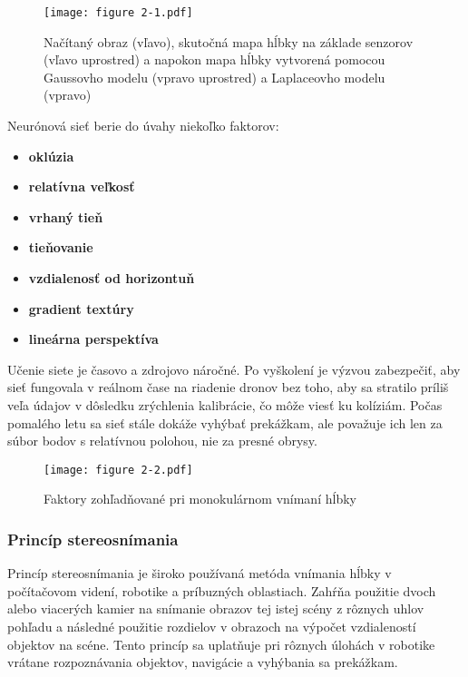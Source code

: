 \begin{figure}[ht!]
    \centering
    \texttt{[image: figure 2-1.pdf]}
    \caption{Načítaný obraz (vľavo), skutočná mapa hĺbky na základe senzorov (vľavo uprostred) a napokon mapa hĺbky vytvorená pomocou Gaussovho modelu (vpravo uprostred) a Laplaceovho modelu (vpravo)}
    \label{o:2-1}
\end{figure}

Neurónová sieť berie do úvahy niekoľko faktorov:
\begin{itemize}
    \item \textbf{oklúzia}
    \item \textbf{relatívna veľkosť}
    \item \textbf{vrhaný tieň}
    \item \textbf{tieňovanie}
    \item \textbf{vzdialenosť od horizontuň}
    \item \textbf{gradient textúry}
    \item \textbf{lineárna perspektíva}
\end{itemize}
Učenie siete je časovo a zdrojovo náročné. Po vyškolení je výzvou zabezpečiť, aby sieť fungovala v reálnom čase na riadenie dronov bez toho, aby sa stratilo príliš veľa údajov v dôsledku zrýchlenia kalibrácie, čo môže viesť ku kolíziám. Počas pomalého letu sa sieť stále dokáže vyhýbať prekážkam, ale považuje ich len za súbor bodov s relatívnou polohou, nie za presné obrysy.

\begin{figure}[ht!]
    \centering
    \texttt{[image: figure 2-2.pdf]}
    \caption{Faktory zohľadňované pri monokulárnom vnímaní hĺbky}
    \label{o:2-2}
\end{figure}

\subsubsection{Princíp stereosnímania}
Princíp stereosnímania je široko používaná metóda vnímania hĺbky v počítačovom videní, robotike a príbuzných oblastiach. Zahŕňa použitie dvoch alebo viacerých kamier na snímanie obrazov tej istej scény z rôznych uhlov pohľadu a následné použitie rozdielov v obrazoch na výpočet vzdialeností objektov na scéne. Tento princíp sa uplatňuje pri rôznych úlohách v robotike vrátane rozpoznávania objektov, navigácie a vyhýbania sa prekážkam.

